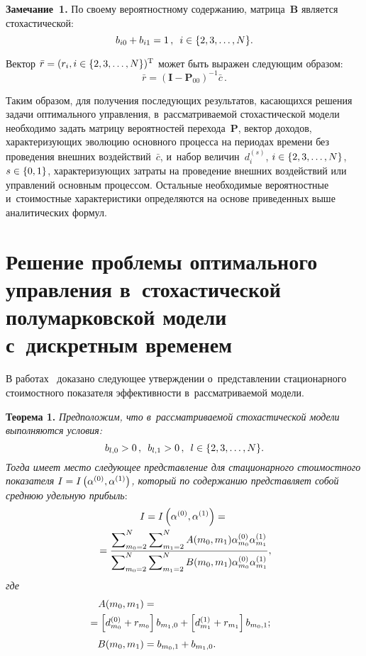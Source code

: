 \begin{multicols}{2}
\smallskip

\noindent
\textbf{Замечание~1.} По своему вероятностному содержанию, мат\-ри\-ца~$\textbf{B}$ 
является стохастической:
$$
b_{i0}+b_{i1} = 1\,,\enskip i\in\lbrace 2,3,\ldots ,N\rbrace.
$$

Вектор $\bar{r}\hm=(r_{i},i\in\lbrace 2,3,\ldots ,N\rbrace )^{\mathrm{T}}$ может
быть выражен сле\-ду\-ющим образом:
$$
\bar{r}=(\textbf{I}-\textbf{P}_{00})^{-1}\bar{c}\,.
$$

Таким образом, для получения последующих результатов, ка\-са\-ющих\-ся решения задачи 
оптимального управ\-ле\-ния, в~рас\-смат\-ри\-ва\-емой сто\-ха\-сти\-че\-ской модели необходимо 
задать мат\-ри\-цу \mbox{вероятностей} перехода~$\textbf{P}$, вектор доходов, 
ха\-рак\-те\-ри\-зу\-ющих эволюцию основного процесса на периодах времени без проведения 
внеш\-них воздействий~$\bar{c}$, и~набор величин~$d_i^{(s)}$, 
$i\hm\in\{2,3,\dots,N\}$, $s\hm\in\{0,1\}$, ха\-рак\-те\-ри\-зу\-ющих за\-тра\-ты на проведение 
внешних воздействий или управ\-ле\-ний основным процессом. Остальные необходимые 
вероятностные и~стоимостные характеристики определяются на основе приведенных 
выше аналитических формул.

\section{Решение проблемы оптимального управления в~стохастической 
полумарковской модели с~дискретным временем}

В работах~\cite{A1, A4} доказано сле\-ду\-ющее утверж\-де\-нии о~пред\-став\-ле\-нии 
стационарного стоимостного показателя эф\-фек\-тив\-ности в~рас\-смат\-ри\-ва\-емой модели.

\smallskip

\noindent
\textbf{Теорема 1.}
\textit{Предположим, что в~рассматриваемой стохастической модели выполняются 
условия: 
$$
b_{l,0}>0\,,\enskip b_{l,1}>0\,,\enskip l\in\{2,3,\dots,N\}.
$$
 Тогда имеет мес\-то 
сле\-ду\-ющее пред\-став\-ле\-ние для стационарного стоимостного показателя 
$I\hm=I\left(\alpha^{(0)},\alpha^{(1)}\right)$, который по содержанию пред\-став\-ля\-ет 
собой сред\-нюю удельную прибыль}:
\begin{multline}
I = I\left(\alpha ^{(0)},\alpha
^{(1)}\right)={}\\
{}=\displaystyle\frac{\displaystyle \sum\nolimits_{m_{0}=2}^{N}{\sum\nolimits_{m_{1}=2}^{N}{A(m_{0},
m_{1})\alpha
_{m_{0}}^{(0)}\alpha_{m_{1}}^{(1)}}}\mathstrut}{\displaystyle \sum\nolimits_{m_{0}=2}^{N}{\sum\nolimits_{m_{
1}=2}^{N}{B(m_{0},m_{1})\alpha
_{m_{0}}^{(0)}\alpha _{m_{1}}^{(1)}}}\mathstrut}, \label{e1-sh}
\end{multline}
\textit{где}
\begin{align}
A(m_{0},m_{1})&={}\notag\\
&\hspace*{-20mm}{}=\left[ d_{m_{0}}^{(0)}+r_{m_{0}}\right] b_{m_{1},0} +\left[ d_{m_{1}}^{(1)}+r_{m_{1}}\right] b_{m_{0},1} ; \label{e2-sh}\\[3pt]
B(m_{0},m_{1})&=b_{m_{0},1}+b_{m_{1},0} . \label{e3-sh}
\end{align}


\end{multicols}

